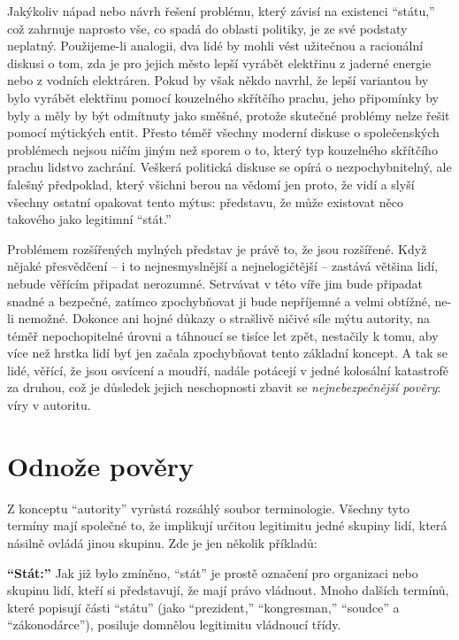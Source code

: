 \documentclass{book}
\begin{document}
Jakýkoliv nápad nebo návrh řešení problému, který závisí na existenci \enquote{státu,} což zahrnuje naprosto vše, co spadá do oblasti politiky, je ze své podstaty neplatný. Použijeme-li analogii, dva lidé by mohli vést užitečnou a racionální diskusi o tom, zda je pro jejich město lepší vyrábět elektřinu z jaderné energie nebo z vodních elektráren. Pokud by však někdo navrhl, že lepší variantou by bylo vyrábět elektřinu pomocí kouzelného skřítčího prachu, jeho připomínky by byly a měly by být odmítnuty jako směšné, protože skutečné problémy nelze řešit pomocí mýtických entit. Přesto téměř všechny moderní diskuse o společenských problémech nejsou ničím jiným než sporem o to, který typ kouzelného skřítčího prachu lidstvo zachrání. Veškerá politická diskuse se opírá o nezpochybnitelný, ale falešný předpoklad, který všichni berou na vědomí jen proto, že vidí a slyší všechny ostatní opakovat tento mýtus: představu, že může existovat něco takového jako legitimní \enquote{stát.}

Problémem rozšířených mylných představ je právě to, že jsou rozšířené. Když nějaké přesvědčení -- i to nejnesmyslnější a nejnelogičtější -- zastává většina lidí, nebude věřícím připadat nerozumné. Setrvávat v této víře jim bude připadat snadné a bezpečné, zatímco zpochybňovat ji bude nepříjemné a velmi obtížné, ne-li nemožné. Dokonce ani hojné důkazy o strašlivě ničivé síle mýtu autority, na téměř nepochopitelné úrovni a táhnoucí se tisíce let zpět, nestačily k tomu, aby více než hrstka lidí byť jen začala zpochybňovat tento základní koncept. A tak se lidé, věřící, že jsou osvícení a moudří, nadále potácejí v jedné kolosální katastrofě za druhou, což je důsledek jejich neschopnosti zbavit se \emph{nejnebezpečnější pověry}: víry v autoritu.

\section{Odnože pověry}

Z konceptu \enquote{autority} vyrůstá rozsáhlý soubor terminologie. Všechny tyto termíny mají společné to, že implikují určitou legitimitu jedné skupiny lidí, která násilně ovládá jinou skupinu. Zde je jen několik příkladů:

\textbf{\enquote{Stát:}} Jak již bylo zmíněno, \enquote{stát} je prostě označení pro organizaci nebo skupinu lidí, kteří si představují, že mají právo vládnout. Mnoho dalších termínů, které popisují části \enquote{státu} (jako \enquote{prezident,} \enquote{kongresman,} \enquote{soudce} a \enquote{zákonodárce}), posiluje domnělou legitimitu vládnoucí třídy.
\end{document}
